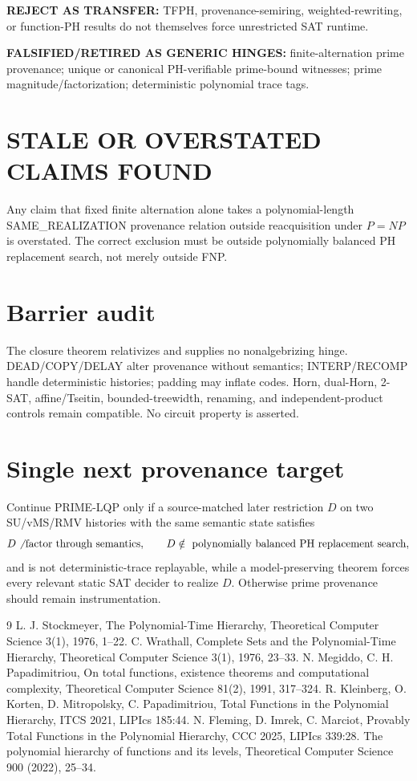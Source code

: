 \documentclass[11pt]{article}
\begin{document}
\textbf{REJECT AS TRANSFER:} TFPH, provenance-semiring, weighted-rewriting, or function-PH results
do not themselves force unrestricted SAT runtime.

\textbf{FALSIFIED/RETIRED AS GENERIC HINGES:} finite-alternation prime provenance; unique or
canonical PH-verifiable prime-bound witnesses; prime magnitude/factorization; deterministic
polynomial trace tags.

\section*{STALE OR OVERSTATED CLAIMS FOUND}
Any claim that fixed finite alternation alone takes a polynomial-length SAME\_REALIZATION
provenance relation outside reacquisition under \(P=NP\) is overstated. The correct exclusion
must be outside polynomially balanced PH replacement search, not merely outside FNP.

\section*{Barrier audit}
The closure theorem relativizes and supplies no nonalgebrizing hinge. DEAD/COPY/DELAY alter
provenance without semantics; INTERP/RECOMP handle deterministic histories; padding may inflate
codes. Horn, dual-Horn, 2-SAT, affine/Tseitin, bounded-treewidth, renaming, and independent-product
controls remain compatible. No circuit property is asserted.

\section*{Single next provenance target}
Continue PRIME-LQP only if a source-matched later restriction \(D\) on two SU/vMS/RMV histories
with the same semantic state satisfies
\[
D\not\text{ factor through semantics},\qquad
D\notin\text{ polynomially balanced PH replacement search},
\]
and is not deterministic-trace replayable, while a model-preserving theorem forces every relevant
static SAT decider to realize \(D\). Otherwise prime provenance should remain instrumentation.

\begin{thebibliography}{9}
 L. J. Stockmeyer, The Polynomial-Time Hierarchy, Theoretical Computer Science 3(1), 1976, 1--22.
 C. Wrathall, Complete Sets and the Polynomial-Time Hierarchy, Theoretical Computer Science 3(1), 1976, 23--33.
 N. Megiddo, C. H. Papadimitriou, On total functions, existence theorems and computational complexity, Theoretical Computer Science 81(2), 1991, 317--324.
 R. Kleinberg, O. Korten, D. Mitropolsky, C. Papadimitriou, Total Functions in the Polynomial Hierarchy, ITCS 2021, LIPIcs 185:44.
 N. Fleming, D. Imrek, C. Marciot, Provably Total Functions in the Polynomial Hierarchy, CCC 2025, LIPIcs 339:28.
 The polynomial hierarchy of functions and its levels, Theoretical Computer Science 900 (2022), 25--34.
\end{thebibliography}
\end{document}
